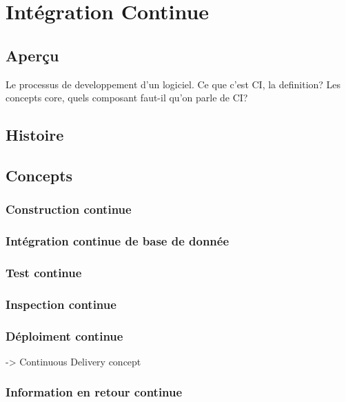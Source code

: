 \chapter{Intégration Continue}
\label{chap:integrationcontinue}

\nocite{duvall:conint}

\section{Aperçu}

Le processus de developpement d'un logiciel.
Ce que c'est CI, la definition?
Les concepts core, quels composant faut-il qu'on parle de CI?

\section{Histoire}

\section{Concepts}

\subsection{Construction continue}

\subsection{Intégration continue de base de donnée}

\subsection{Test continue}

\subsection{Inspection continue}

\subsection{Déploiment continue}

-> Continuous Delivery concept

\subsection{Information en retour continue}
\newpage
